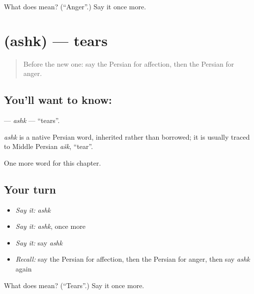 \begin{tcolorbox}[breakable,colback=teal!4,colframe=teal!35!black,title={Before you move on}]
What does  mean? (\textquotedblleft{}Anger\textquotedblright{}.) Say it once more.
\end{tcolorbox}
\section[\texorpdfstring{\fa{اشک} (ashk)}{اشک (ashk)}]{ (ashk) — tears}

\label{lesson:FA-C170-ashk}



\begin{quote}
Before the new one: say the Persian for affection, then the Persian for anger.
\end{quote}

\subsection*{You'll want to know: }
\textbf{} — \emph{ashk} — \textquotedblleft{}tears\textquotedblright{}.

\begin{cousinweb}
\emph{ashk} is a native Persian word, inherited rather than borrowed; it is usually traced to Middle Persian \emph{ašk}, \textquotedblleft{}tear\textquotedblright{}.
\end{cousinweb}

\begin{grammarlens}[title={What you've built}]
One more word for this chapter.
\end{grammarlens}

\subsection*{Your turn}
\begin{itemize}
\raggedright
  \item \emph{Say it:} \emph{ashk}
  \item \emph{Say it:} \emph{ashk}, once more
  \item \emph{Say it:} say \emph{ashk}
  \item \emph{Recall:} say the Persian for affection, then the Persian for anger, then say \emph{ashk} again
\end{itemize}

\begin{tcolorbox}[breakable,colback=teal!4,colframe=teal!35!black,title={Before you move on}]
What does  mean? (\textquotedblleft{}Tears\textquotedblright{}.) Say it once more.
\end{tcolorbox}

